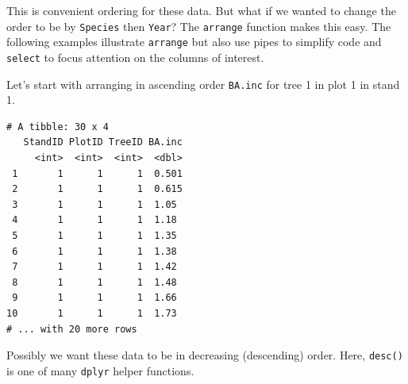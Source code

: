 \documentclass[]{krantz}
\makeatletter
\newenvironment{Shaded}{\begin{snugshade}}{\end{snugshade}}
\newcommand{\KeywordTok}[1]{\textcolor[rgb]{0.27,0.27,0.27}{\textbf{#1}}}
\newcommand{\DecValTok}[1]{\textcolor[rgb]{0.06,0.06,0.06}{#1}}
\newcommand{\StringTok}[1]{\textcolor[rgb]{0.5,0.5,0.5}{#1}}
\newcommand{\OperatorTok}[1]{\textcolor[rgb]{0.43,0.43,0.43}{\textbf{#1}}}
\newcommand{\NormalTok}[1]{#1}
\newenvironment{kframe}{%
\medskip{}
\setlength{\fboxsep}{.8em}
 \def\at@end@of@kframe{}%
 \ifinner\ifhmode%
  \def\at@end@of@kframe{\end{minipage}}%
  \begin{minipage}{\columnwidth}%
 \fi\fi%
 \def\FrameCommand##1{\hskip\@totalleftmargin \hskip-\fboxsep
 \colorbox{shadecolor}{##1}\hskip-\fboxsep
     \hskip-\linewidth \hskip-\@totalleftmargin \hskip\columnwidth}%
 \MakeFramed {\advance\hsize-\width
   \@totalleftmargin\z@ \linewidth\hsize
   \@setminipage}}%
 {\par\unskip\endMakeFramed%
 \at@end@of@kframe}
\renewenvironment{Shaded}{\begin{kframe}}{\end{kframe}}
\theoremstyle{definition}
\theoremstyle{definition}
\theoremstyle{definition}
\theoremstyle{remark}
\makeatother
\begin{document}
This is convenient ordering for these data. But what if we wanted to
change the order to be by \texttt{Species} then \texttt{Year}? The
\texttt{arrange} function makes this easy. The following examples
illustrate \texttt{arrange} but also use pipes to simplify code and
\texttt{select} to focus attention on the columns of interest.

Let's start with arranging in ascending order \texttt{BA.inc} for tree 1
in plot 1 in stand 1.

\begin{Shaded}
\end{Shaded}

\begin{verbatim}
# A tibble: 30 x 4
   StandID PlotID TreeID BA.inc
     <int>  <int>  <int>  <dbl>
 1       1      1      1  0.501
 2       1      1      1  0.615
 3       1      1      1  1.05 
 4       1      1      1  1.18 
 5       1      1      1  1.35 
 6       1      1      1  1.38 
 7       1      1      1  1.42 
 8       1      1      1  1.48 
 9       1      1      1  1.66 
10       1      1      1  1.73 
# ... with 20 more rows
\end{verbatim}

Possibly we want these data to be in decreasing (descending) order.
Here, \texttt{desc()} is one of many \texttt{dplyr} helper functions.

\begin{Shaded}
\end{Shaded}
\end{document}
